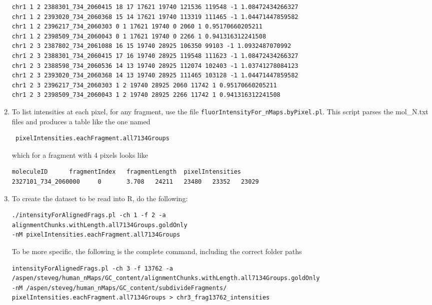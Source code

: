 \documentclass[11pt]{article}
\begin{document}
\begin{enumerate}
\begin{verbatim}
chr1 1 2 2388301_734_2060415 18 17 17621 19740 121536 119548 -1 1.08472434266327
chr1 1 2 2393020_734_2060368 15 14 17621 19740 113319 111465 -1 1.04471447859582
chr1 1 2 2396217_734_2060303 0 1 17621 19740 0 2060 1 0.95170660205211
chr1 1 2 2398509_734_2060043 0 1 17621 19740 0 2266 1 0.941316312241508
chr1 2 3 2387802_734_2061088 16 15 19740 28925 106350 99103 -1 1.0932487070992
chr1 2 3 2388301_734_2060415 17 16 19740 28925 119548 111623 -1 1.08472434266327
chr1 2 3 2388598_734_2060536 14 13 19740 28925 112074 102403 -1 1.03741278084123
chr1 2 3 2393020_734_2060368 14 13 19740 28925 111465 103128 -1 1.04471447859582
chr1 2 3 2396217_734_2060303 1 2 19740 28925 2060 11742 1 0.95170660205211
chr1 2 3 2398509_734_2060043 1 2 19740 28925 2266 11742 1 0.941316312241508
\end{verbatim}
\item
To list intensities at each pixel, for any fragment, use the file \texttt{fluorIntensityFor\_nMaps.byPixel.pl}. This script parses the mol\_N.txt files and produces a table like the one named \begin{verbatim} pixelIntensities.eachFragment.all7134Groups \end{verbatim}
which for a fragment with 4 pixels looks like
\begin{verbatim}
moleculeID      fragmentIndex   fragmentLength  pixelIntensities
2327101_734_2060000     0       3.708   24211   23480   23352   23029
\end{verbatim}
\item
To create the dataset to be read into R, do the following:\\
\begin{verbatim}
./intensityForAlignedFrags.pl -ch 1 -f 2 -a 
alignmentChunks.withLength.all7134Groups.goldOnly 
-nM pixelIntensities.eachFragment.all7134Groups
\end{verbatim}
To be more specific, the following is the complete command, including the correct folder paths
\begin{verbatim}
intensityForAlignedFrags.pl -ch 3 -f 13762 -a 
/aspen/steveg/human_nMaps/GC_content/alignmentChunks.withLength.all7134Groups.goldOnly 
-nM /aspen/steveg/human_nMaps/GC_content/subdivideFragments/
pixelIntensities.eachFragment.all7134Groups > chr3_frag13762_intensities
\end{verbatim}

\end{enumerate}
\end{document}
